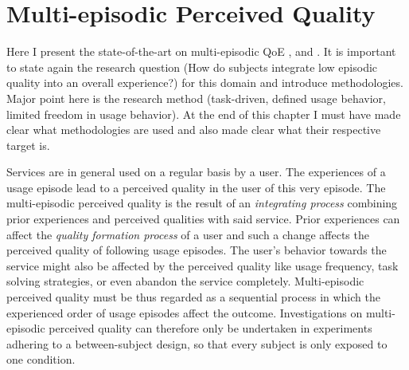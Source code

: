 \chapter{Multi-episodic Perceived Quality}\label{chap:state-of-the-art}
\begin{chapter-abstract}
Here I present the state-of-the-art on multi-episodic QoE \cite{duncanson_average_1969}, and \cite{moller_single-call_2011}.
It is important to state again the research question (How do subjects integrate low episodic quality into an overall experience?) for this domain and introduce methodologies.
Major point here is the research method (task-driven, defined usage behavior, limited freedom in usage behavior).
At the end of this chapter I must have made clear what methodologies are used and also made clear what their respective target is.
\end{chapter-abstract}


Services are in general used on a regular basis by a user.
The experiences of a usage episode lead to a perceived quality in the user of this very episode. %
The multi-episodic perceived quality is the result of an \emph{integrating process} combining prior experiences and perceived qualities with said service.
Prior experiences can affect the \emph{quality formation process} of a user and such a change affects the perceived quality of following usage episodes.
The user's behavior towards the service might also be affected by the perceived quality like usage frequency, task solving strategies, or even abandon the service completely.
Multi-episodic perceived quality must be thus regarded as a sequential process in which the experienced order of usage episodes affect the outcome. %
Investigations on multi-episodic perceived quality can therefore only be undertaken in experiments adhering to a between-subject design, so that every subject is only exposed to one condition.

